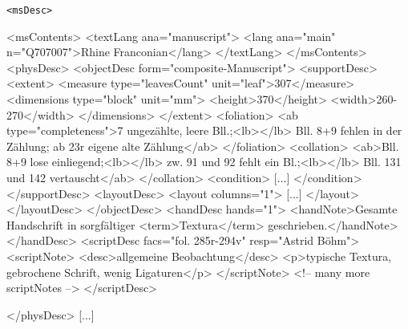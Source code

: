 \begin{frame}{\texttt{<msDesc>}}
\framebreak 


\begin{xmlcode}
[...]
          <msContents>
            <textLang ana="manuscript">
              <lang ana="main" n="Q707007">Rhine Franconian</lang>
            </textLang>
          </msContents>
          <physDesc>
            <objectDesc form="composite-Manuscript">
              <supportDesc>
                <extent>
                  <measure type="leavesCount" unit="leaf">307</measure>
                  <dimensions type="block" unit="mm">
                    <height>370</height>
                    <width>260-270</width>
                  </dimensions>
                </extent>
                <foliation>
                  <ab type="completeness">7 ungezählte, leere Bll.;<lb></lb>
										Bll. 8+9 fehlen in der Zählung; ab 23r eigene alte Zählung</ab>
                </foliation>
                <collation>
                  <ab>Bll. 8+9 lose einliegend;<lb></lb>
										zw. 91 und 92 fehlt ein Bl.;<lb></lb>
										Bll. 131 und 142 vertauscht</ab>
                </collation>
                <condition> [...] </condition>
              </supportDesc>
              <layoutDesc>       
         <layout columns="1"> [...] </layout>
              </layoutDesc>
            </objectDesc>
            <handDesc hands="1">
              <handNote>Gesamte Handschrift in sorgfältiger <term>Textura</term> geschrieben.</handNote>
            </handDesc>
            <scriptDesc facs="fol. 285r-294v" resp="Astrid Böhm">
              <scriptNote>
                <desc>allgemeine Beobachtung</desc>
                <p>typische Textura, gebrochene Schrift, wenig Ligaturen</p>
              </scriptNote>
              <!-- many more scriptNotes -->
            </scriptDesc>
            
          </physDesc>
[...]
\end{xmlcode}



\framebreak 


\end{frame}
